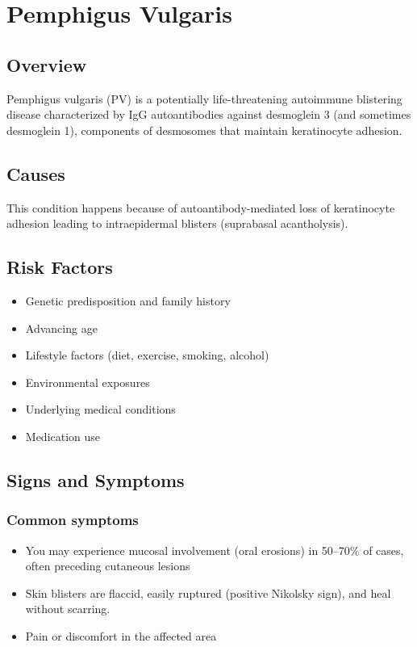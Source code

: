 \chapter{Pemphigus Vulgaris}
\label{sec:Pemphigus Vulgaris}

\section{Overview}
Pemphigus vulgaris (PV) is a potentially life-threatening autoimmune blistering disease characterized by IgG autoantibodies against desmoglein 3 (and sometimes desmoglein 1), components of desmosomes that maintain keratinocyte adhesion.
\section{Causes}
This condition happens because of autoantibody-mediated loss of keratinocyte adhesion leading to intraepidermal blisters (suprabasal acantholysis).     
\section{Risk Factors}

\begin{itemize}[noitemsep]
  \item Genetic predisposition and family history
  \item Advancing age
  \item Lifestyle factors (diet, exercise, smoking, alcohol)
  \item Environmental exposures
  \item Underlying medical conditions
  \item Medication use
\end{itemize}
\section{Signs and Symptoms}

\subsection{Common symptoms}
\begin{itemize}[noitemsep]
  \item You may experience mucosal involvement (oral erosions) in 50--70\% of cases, often preceding cutaneous lesions
  \item Skin blisters are flaccid, easily ruptured (positive Nikolsky sign), and heal without scarring.
  \item Pain or discomfort in the affected area
  \end{itemize}

